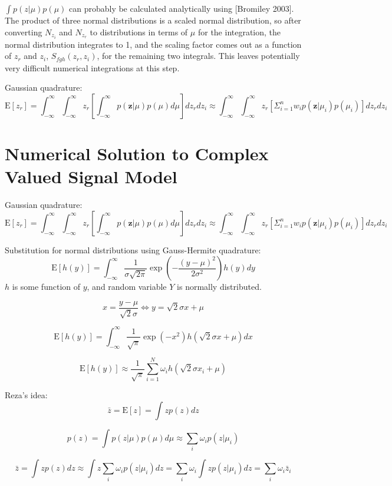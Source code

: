 \documentclass{article}         %
\theoremstyle{definition}
\theoremstyle{remark}
\newcommand{\eq}[1]{\begin{equation} #1 \end{equation}}
\newcommand{\zbf}{\mathbf{z}}
\newcommand{\zcond}{\mathbf{z}|\mu}
\newcommand{\paren}[1]{\left(#1\right)}
\newcommand{\bracket}[1]{\left[#1\right]}
\newcommand{\expect}[1]{\mathrm{E}\left[#1\right]}
\newcommand{\intinfty}{\int_{-\infty}^\infty}
\newcommand{\sumin}{\sum_{i=1}^N}
\begin{document}
$\int p(z|\mu)p(\mu)$ can probably be calculated analytically using [Bromiley 2003]. The product of three normal distributions is a scaled normal distribution, so after converting $N_{z_i}$ and $N_{z_r}$ to distributions in terms of $\mu$ for the integration, the normal distribution integrates to 1, and the scaling factor comes out as a function of $z_r$ and $z_i$, $S_{fgh}\paren{z_r,z_i}$, for the remaining two integrals. This leaves potentially very difficult numerical integrations at this step.

Gaussian quadrature:
\eq{\expect{z_r} = \int_{-\infty}^\infty\int_{-\infty}^\infty z_r \bracket{\int_{-\infty}^\infty p\paren{\zcond}p\paren{\mu}d\mu}dz_rdz_i \approx \int_{-\infty}^\infty\int_{-\infty}^\infty z_r \bracket{\Sigma_{i=1}^n w_i p\paren{\zbf|\mu_i}p\paren{\mu_i}}dz_rdz_i} 

\section{Numerical Solution to Complex Valued Signal Model}\label{NumericalSoln}

Gaussian quadrature:
\eq{\expect{z_r} = \int_{-\infty}^\infty\int_{-\infty}^\infty z_r \bracket{\int_{-\infty}^\infty p\paren{\zcond}p\paren{\mu}d\mu}dz_rdz_i \approx \int_{-\infty}^\infty\int_{-\infty}^\infty z_r \bracket{\Sigma_{i=1}^n w_i p\paren{\zbf|\mu_i}p\paren{\mu_i}}dz_rdz_i} 

Substitution for normal distributions using Gauss-Hermite quadrature:
\eq{\expect{h\paren{y}} = \intinfty\frac{1}{\sigma\sqrt{2\pi}}\exp\paren{-\frac{\paren{y-\mu}^2}{2\sigma^2}}h\paren{y}dy}
$h$ is some function of $y$, and random variable $Y$ is normally distributed.

\eq{x = \frac{y-\mu}{\sqrt{2}\sigma} \Leftrightarrow y = \sqrt{2}\sigma x+\mu}

\eq{\expect{h\paren{y}} = \intinfty\frac{1}{\sqrt{\pi}}\exp\paren{-x^2}h\paren{\sqrt{2}\sigma x+\mu}dx}

\eq{\expect{h\paren{y}} \approx \frac{1}{\sqrt{\pi}}\sumin\omega_i h\paren{\sqrt{2}\sigma x_i+\mu}}

Reza's idea:
\eq{\bar{z} = \expect{z} = \int zp\paren{z}dz}

\eq{p\paren{z} = \int p\paren{z|\mu}p\paren{\mu}d\mu \approx \sum_i\omega_i p\paren{z|\mu_i}}

\eq{\bar{z} = \int zp\paren{z}dz \approx \int z\sum_i \omega_i p\paren{z|\mu_i}dz = \sum_i\omega_i\int zp\paren{z|\mu_i}dz = \sum_i\omega_i\bar{z}_i}
\end{document}
